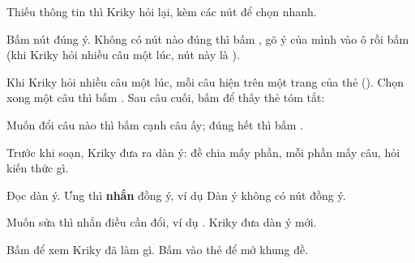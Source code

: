 
Thiếu thông tin thì Kriky hỏi lại, kèm các nút để chọn nhanh.


\begin{buoc}
  \item Bấm nút đúng ý. Không có nút nào đúng thì bấm , gõ ý của mình vào ô  rồi bấm  (khi Kriky hỏi nhiều câu một lúc, nút này là ).
\end{buoc}

Khi Kriky hỏi nhiều câu một lúc, mỗi câu hiện trên một trang của thẻ (). Chọn xong một câu
thì bấm . Sau câu cuối, bấm  để thấy thẻ tóm tắt:


\begin{buoc}
  \item Muốn đổi câu nào thì bấm  cạnh câu ấy; đúng hết thì bấm .
\end{buoc}


Trước khi soạn, Kriky đưa ra dàn ý: đề chia mấy phần, mỗi phần mấy câu, hỏi kiến thức gì.


\begin{buoc}
  \item Đọc dàn ý. Ưng thì \textbf{nhắn} đồng ý, ví dụ  Dàn ý không có nút đồng ý.
  \item Muốn sửa thì nhắn điều cần đổi, ví dụ . Kriky đưa dàn ý mới.
\end{buoc}



Bấm   để xem Kriky đã làm gì. Bấm vào thẻ  để mở khung đề.




